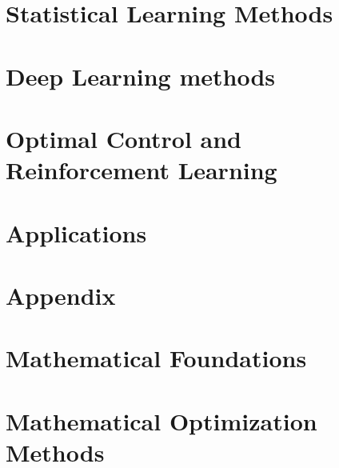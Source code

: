 \documentclass[oneside,hidelinks,12pt,letterpaper]{scrbook} %
\theoremstyle{remark}
\theoremstyle{coloredRemark}
\theoremstyle{coloredNote}
\begin{document}
\startcontents[chapters]
\part{Statistical Learning Methods}
%
%
%
%
\startcontents[chapters]
\part{Deep Learning methods}
%


\startcontents[chapters]	
\part{Optimal Control and Reinforcement Learning}



\startcontents[chapters]	
\part{Applications}

%
%
%
%

\startcontents[chapters]
\part{Appendix}
\appendix
%
\fi


\part{Mathematical Foundations}



\startcontents[chapters]

\part{Mathematical Optimization Methods}
\end{document}
